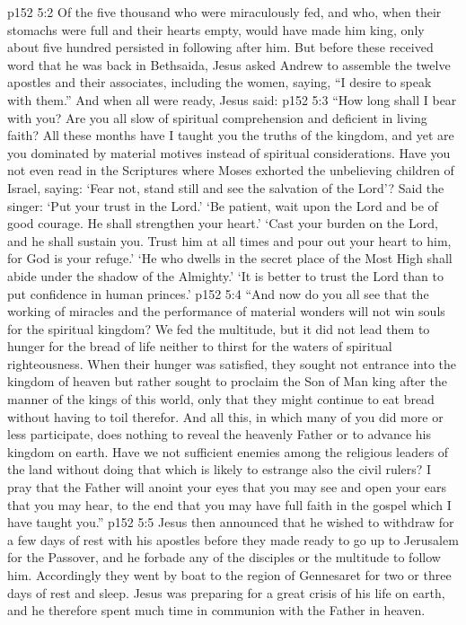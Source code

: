 \vs p152 5:2 \pc Of the five thousand who were miraculously fed, and who, when their stomachs were full and their hearts empty, would have made him king, only about five hundred persisted in following after him. But before these received word that he was back in Bethsaida, Jesus asked Andrew to assemble the twelve apostles and their associates, including the women, saying, \textcolor{ubdarkred}{“I desire to speak with them.”} And when all were ready, Jesus said:
\vs p152 5:3 \pc \textcolor{ubdarkred}{“How long shall I bear with you? Are you all slow of spiritual comprehension and deficient in living faith? All these months have I taught you the truths of the kingdom, and yet are you dominated by material motives instead of spiritual considerations. Have you not even read in the Scriptures where Moses exhorted the unbelieving children of Israel, saying: ‘Fear not, stand still and see the salvation of the Lord’? Said the singer: ‘Put your trust in the Lord.’ ‘Be patient, wait upon the Lord and be of good courage. He shall strengthen your heart.’ ‘Cast your burden on the Lord, and he shall sustain you. Trust him at all times and pour out your heart to him, for God is your refuge.’ ‘He who dwells in the secret place of the Most High shall abide under the shadow of the Almighty.’ ‘It is better to trust the Lord than to put confidence in human princes.’}
\vs p152 5:4 \textcolor{ubdarkred}{“And now do you all see that the working of miracles and the performance of material wonders will not win souls for the spiritual kingdom? We fed the multitude, but it did not lead them to hunger for the bread of life neither to thirst for the waters of spiritual righteousness. When their hunger was satisfied, they sought not entrance into the kingdom of heaven but rather sought to proclaim the Son of Man king after the manner of the kings of this world, only that they might continue to eat bread without having to toil therefor. And all this, in which many of you did more or less participate, does nothing to reveal the heavenly Father or to advance his kingdom on earth. Have we not sufficient enemies among the religious leaders of the land without doing that which is likely to estrange also the civil rulers? I pray that the Father will anoint your eyes that you may see and open your ears that you may hear, to the end that you may have full faith in the gospel which I have taught you.”}
\vs p152 5:5 \pc Jesus then announced that he wished to withdraw for a few days of rest with his apostles before they made ready to go up to Jerusalem for the Passover, and he forbade any of the disciples or the multitude to follow him. Accordingly they went by boat to the region of Gennesaret for two or three days of rest and sleep. Jesus was preparing for a great crisis of his life on earth, and he therefore spent much time in communion with the Father in heaven.
